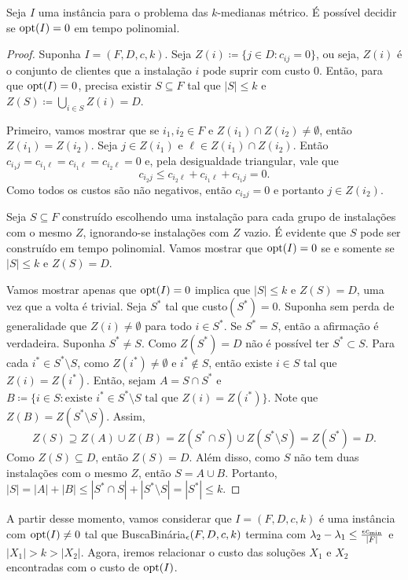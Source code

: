 \begin{lemma}
    Seja $I$ uma instância para o problema das $k$-medianas métrico. É possível decidir se $\mathrm{opt}(I) = 0$ em tempo polinomial.
\end{lemma}
\begin{proof}
    Suponha $I = (F,D,c,k)$. Seja $Z(i) \coloneqq \{j \in D: c_{ij} = 0\}$, ou seja, $Z(i)$ é o conjunto de clientes que a instalação $i$ pode suprir com custo 0. Então, para que $\mathrm{opt}(I) = 0$, precisa existir $S \subseteq F$ tal que $|S|\leq k$ e $Z(S) \coloneqq \bigcup_{i \in S} Z(i) = D$.

    Primeiro, vamos mostrar que se $i_1, i_2\in F $ e $Z(i_1) \cap Z(i_2) \neq \emptyset$, então $Z(i_1) = Z(i_2)$.  Seja $j \in Z(i_1)$ e $\ell \in Z(i_1) \cap Z(i_2)$. Então $c_{i_1j} = c_{i_1\ell} = c_{i_1\ell} = c_{i_2\ell} = 0$ e, pela desigualdade triangular, vale que
    \[c_{i_2j} \leq c_{i_2\ell} + c_{i_1\ell} + c_{i_1j} = 0.\]
    Como todos os custos são não negativos, então $c_{i_2j} = 0$ e portanto $j \in Z(i_2)$.

    Seja $S \subseteq F$ construído escolhendo uma instalação para cada grupo de instalações com o mesmo $Z$, ignorando-se instalações com $Z$ vazio. É evidente que $S$ pode ser construído em tempo polinomial. Vamos mostrar que $\mathrm{opt}(I) = 0$ se e somente se $|S| \leq k$ e $Z(S) = D$.

    Vamos mostrar apenas que $\mathrm{opt}(I) = 0$ implica que $|S|\leq k$ e $Z(S) = D$, uma vez que a volta é trivial. Seja $S^*$ tal que custo$(S^*) = 0$. Suponha sem perda de generalidade que $Z(i) \neq \emptyset$ para todo $i \in S^*$. Se $S^* = S$, então a afirmação é verdadeira. Suponha $S^* \neq S$. Como $Z(S^*)=D$ não é possível ter $S^* \subset S$. Para cada $i^* \in S^* \setminus S$, como $Z(i^*) \neq \emptyset$ e $i^* \not \in S$, então existe $i \in S$ tal que $Z(i) = Z(i^*)$. Então, sejam $A = S \cap S^*$ e $B \coloneqq \{i \in S: \text{existe } i^* \in S^* \setminus S \text{ tal que } Z(i) = Z(i^*)\}$. Note que $Z(B) = Z(S^*\setminus S)$. Assim,
    \[Z(S) \supseteq Z(A) \cup Z(B) = Z(S^* \cap S) \cup Z(S^*\setminus S) = Z(S^*) = D.\]
    Como $Z(S) \subseteq D$, então $Z(S) = D$. Além disso, como $S$ não tem duas instalações com o mesmo $Z$, então $S = A \cup B$. Portanto, $|S| = |A| + |B| \leq |S^* \cap S| + |S^* \setminus S| = |S^*| \leq k$.
\end{proof} 

A partir desse momento, vamos considerar que $I = (F,D,c,k)$ é uma instância com $\mathrm{opt}(I) \neq 0$ tal que {\sc BuscaBinária$_\epsilon(F,D,c,k)$} termina com $\lambda_2 - \lambda_1 \leq \frac{\epsilon c_\text{min}}{|F|}$ e $|X_1| > k > |X_2|$.
Agora, iremos relacionar o custo das soluções $X_1$ e $X_2$ encontradas com o custo de $\mathrm{opt}(I)$.

